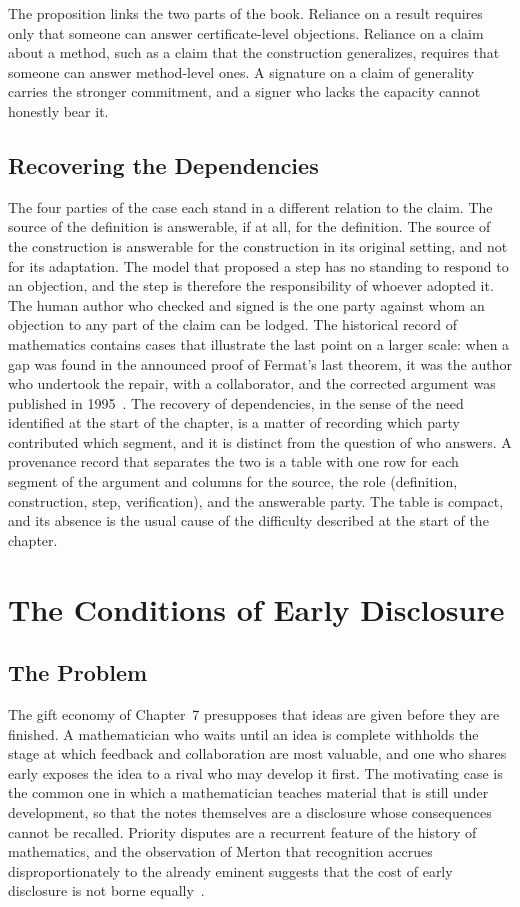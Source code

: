 \documentclass[11pt]{book}
\theoremstyle{definition}
\theoremstyle{remark}
\begin{document}
The proposition links the two parts of the book. Reliance on a result requires only that someone can answer certificate-level objections. Reliance on a claim about a method, such as a claim that the construction generalizes, requires that someone can answer method-level ones. A signature on a claim of generality carries the stronger commitment, and a signer who lacks the capacity cannot honestly bear it.

\section{Recovering the Dependencies}

The four parties of the case each stand in a different relation to the claim. The source of the definition is answerable, if at all, for the definition. The source of the construction is answerable for the construction in its original setting, and not for its adaptation. The model that proposed a step has no standing to respond to an objection, and the step is therefore the responsibility of whoever adopted it. The human author who checked and signed is the one party against whom an objection to any part of the claim can be lodged. The historical record of mathematics contains cases that illustrate the last point on a larger scale: when a gap was found in the announced proof of Fermat's last theorem, it was the author who undertook the repair, with a collaborator, and the corrected argument was published in 1995~\cite{wiles,taylorwiles}. The recovery of dependencies, in the sense of the need identified at the start of the chapter, is a matter of recording which party contributed which segment, and it is distinct from the question of who answers. A provenance record that separates the two is a table with one row for each segment of the argument and columns for the source, the role (definition, construction, step, verification), and the answerable party. The table is compact, and its absence is the usual cause of the difficulty described at the start of the chapter.

\chapter{The Conditions of Early Disclosure}

\section{The Problem}

The gift economy of Chapter~7 presupposes that ideas are given before they are finished. A mathematician who waits until an idea is complete withholds the stage at which feedback and collaboration are most valuable, and one who shares early exposes the idea to a rival who may develop it first. The motivating case is the common one in which a mathematician teaches material that is still under development, so that the notes themselves are a disclosure whose consequences cannot be recalled. Priority disputes are a recurrent feature of the history of mathematics, and the observation of Merton that recognition accrues disproportionately to the already eminent suggests that the cost of early disclosure is not borne equally~\cite{merton}.
\end{document}
